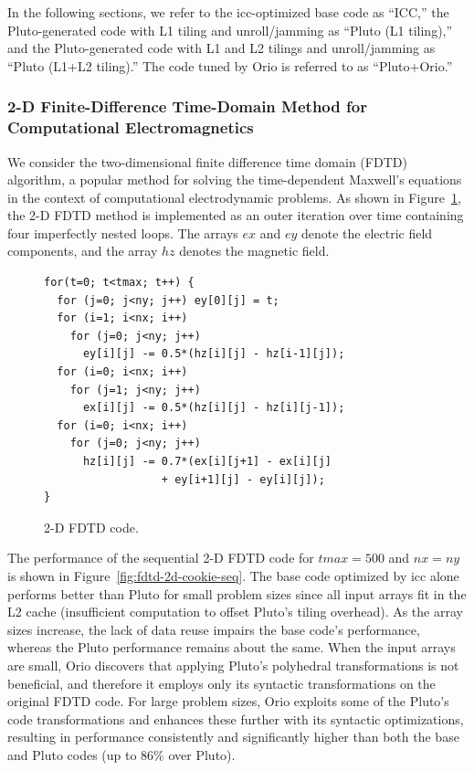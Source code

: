 In the following sections, we refer to the icc-optimized base code as
``ICC,'' the Pluto-generated code with L1 tiling and
unroll/jamming as ``Pluto (L1 tiling),'' and the Pluto-generated code with L1
and L2 tilings and unroll/jamming as ``Pluto (L1+L2 tiling).'' The code
tuned by Orio is referred to as ``Pluto+Orio.''
 
\subsubsection{2-D Finite-Difference Time-Domain Method for Computational Electromagnetics}  
We consider the two-dimensional finite difference time domain (FDTD)
algorithm, a popular method for solving the time-dependent Maxwell's
equations in the context of computational electrodynamic problems. As
shown in Figure~\ref{fig:fdtd-2d-code}, the 2-D FDTD method is
implemented as an outer iteration over time containing four
imperfectly nested loops.  The arrays $ex$ and $ey$ denote the
electric field components, and the array $hz$ denotes the magnetic
field.

%
\begin{figure}
\begin{center}
\begin{minipage}{3in} 
\scriptsize
\begin{verbatim} 
for(t=0; t<tmax; t++) { 
  for (j=0; j<ny; j++) ey[0][j] = t; 
  for (i=1; i<nx; i++) 
    for (j=0; j<ny; j++) 
      ey[i][j] -= 0.5*(hz[i][j] - hz[i-1][j]); 
  for (i=0; i<nx; i++) 
    for (j=1; j<ny; j++) 
      ex[i][j] -= 0.5*(hz[i][j] - hz[i][j-1]); 
  for (i=0; i<nx; i++) 
    for (j=0; j<ny; j++) 
      hz[i][j] -= 0.7*(ex[i][j+1] - ex[i][j]
                  + ey[i+1][j] - ey[i][j]); 
} 
\end{verbatim} 
\end{minipage} 
\end{center}
\caption{2-D FDTD code.} 
\label{fig:fdtd-2d-code} 
\end{figure}
%

The performance of the sequential 2-D FDTD code for $tmax=500$ and $nx=ny$ is
shown in Figure~\ref{fig:fdtd-2d-cookie-seq}. The base code optimized by icc
alone performs better than Pluto for small problem sizes since all input
arrays fit in the L2 cache (insufficient computation to offset Pluto's tiling
overhead). As the array sizes increase, the lack of data reuse impairs the
base code's performance, whereas the Pluto performance remains about the
same.
When the input arrays are small, Orio discovers that applying
Pluto's polyhedral transformations is not beneficial, and therefore
it employs only its syntactic transformations on the original FDTD
code. For large problem sizes, Orio exploits some of the Pluto's code
transformations and enhances these further with its syntactic
optimizations, resulting in performance consistently and significantly
higher than both the base and Pluto codes (up to 86\% over Pluto).


